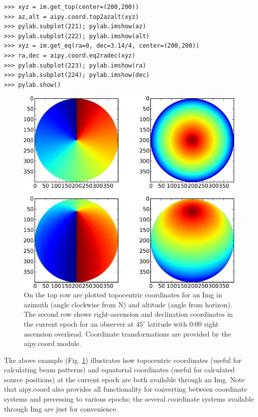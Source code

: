 \begin{verbatim}
>>> xyz = im.get_top(center=(200,200))
>>> az,alt = aipy.coord.top2azalt(xyz)
>>> pylab.subplot(221); pylab.imshow(az)
>>> pylab.subplot(222); pylab.imshow(alt)
>>> xyz = im.get_eq(ra=0, dec=3.14/4, center=(200,200))
>>> ra,dec = aipy.coord.eq2radec(xyz)
>>> pylab.subplot(223); pylab.imshow(ra)
>>> pylab.subplot(224); pylab.imshow(dec)
>>> pylab.show()
\end{verbatim}

\begin{figure}
\begin{center}
\includegraphics[scale=.4]{img_crd.jpg}
\caption{On the top row are plotted topocentric coordinates for an Img in
azimuth (angle clockwise from N) and altitude (angle from horizon).  The
second row shows right-ascension and declination coordinates in the current
epoch for an observer at $45^\circ$ latitude with 0:00 right ascension
overhead.  Coordinate transformations are provided by the aipy.coord module.}
\label{fig:img_crd}
\end{center}
\end{figure}

The above example (Fig. \ref{fig:img_crd}) illustrates how topocentric
coordinates (useful for calculating beam patterns) and equatorial coordinates
(useful for calculated source positions) at the current epoch are both
available through an Img.  Note that aipy.coord also provides all
functionality for converting between coordinate systems and precessing to
various epochs; the several coordinate systems available through Img are just
for convenience.

